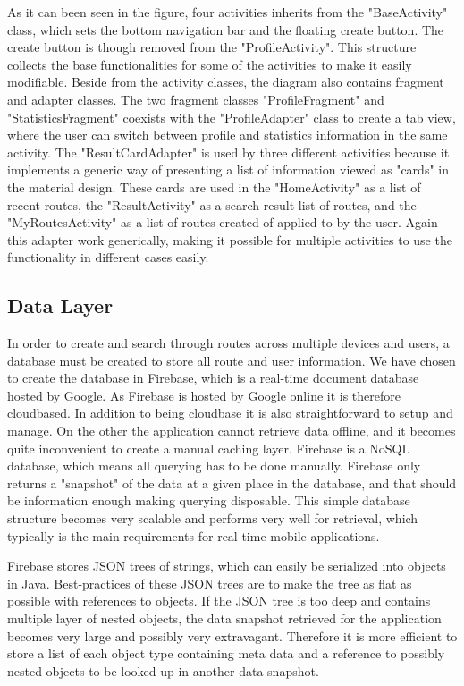 As it can been seen in the figure, four activities inherits from the "BaseActivity" class, which sets the bottom navigation bar and the floating create button. The create button is though removed from the "ProfileActivity". 
This structure collects the base functionalities for some of the activities to make it easily modifiable.
Beside from the activity classes, the diagram also contains fragment and adapter classes. The two fragment classes "ProfileFragment" and "StatisticsFragment" coexists with the "ProfileAdapter" class to create a tab view, where the user can switch between profile and statistics information in the same activity. The "ResultCardAdapter" is used by three different activities because it implements a generic way of presenting a list of information viewed as "cards" in the material design. These cards are used in the "HomeActivity" as a list of recent routes, the "ResultActivity" as a search result list of routes, and the "MyRoutesActivity" as a list of routes created of applied to by the user. Again this adapter work generically, making it possible for multiple activities to use the functionality in different cases easily.

\subsection{Data Layer}
\label{sec:data_layer_design}

In order to create and search through routes across multiple devices and users, a database must be created to store all route and user information.
We have chosen to create the database in Firebase, which is a real-time document database hosted by Google. As Firebase is hosted by Google online it is therefore cloudbased. In addition to being cloudbase it is also straightforward to setup and manage. On the other the application cannot retrieve data offline, and it becomes quite inconvenient to create a manual caching layer. Firebase is a NoSQL database, which means all querying has to be done manually. Firebase only returns a "snapshot" of the data at a given place in the database, and that should be information enough making querying disposable. This simple database structure becomes very scalable and performs very well for retrieval, which typically is the main requirements for real time mobile applications.

Firebase stores JSON trees of strings, which can easily be serialized into objects in Java. Best-practices of these JSON trees are to make the tree as flat as possible with references to objects. If the JSON tree is too deep and contains multiple layer of nested objects, the data snapshot retrieved for the application becomes very large and possibly very extravagant. Therefore it is more efficient to store a list of each object type containing meta data and a reference to possibly nested objects to be looked up in another data snapshot.

